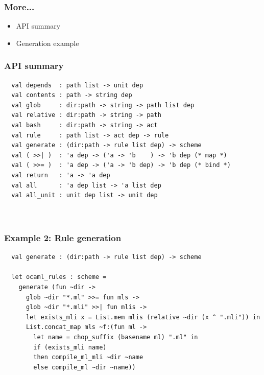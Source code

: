 \documentclass{beamer}
\begin{document}
%
%


\begin{frame}[fragile]
\frametitle{More...}
\begin{itemize}
\item API summary
\item Generation example
\end{itemize}
\end{frame}


\begin{frame}[fragile]
\frametitle{API summary}
{\footnotesize
\begin{verbatim}
  val depends  : path list -> unit dep
  val contents : path -> string dep
  val glob     : dir:path -> string -> path list dep
  val relative : dir:path -> string -> path
  val bash     : dir:path -> string -> act
  val rule     : path list -> act dep -> rule
  val generate : (dir:path -> rule list dep) -> scheme
  val ( >>| )  : 'a dep -> ('a -> 'b    ) -> 'b dep (* map *)
  val ( >>= )  : 'a dep -> ('a -> 'b dep) -> 'b dep (* bind *)
  val return   : 'a -> 'a dep
  val all      : 'a dep list -> 'a list dep
  val all_unit : unit dep list -> unit dep

  
\end{verbatim}}
\end{frame}


\begin{frame}[fragile]
\frametitle{Example 2: Rule generation}
{\footnotesize
\begin{verbatim}
  val generate : (dir:path -> rule list dep) -> scheme

  let ocaml_rules : scheme =
    generate (fun ~dir ->
      glob ~dir "*.ml" >>= fun mls ->
      glob ~dir "*.mli" >>| fun mlis ->
      let exists_mli x = List.mem mlis (relative ~dir (x ^ ".mli")) in
      List.concat_map mls ~f:(fun ml ->
        let name = chop_suffix (basename ml) ".ml" in
        if (exists_mli name)
        then compile_ml_mli ~dir ~name
        else compile_ml ~dir ~name))


\end{verbatim}}
\end{frame}
\end{document}
